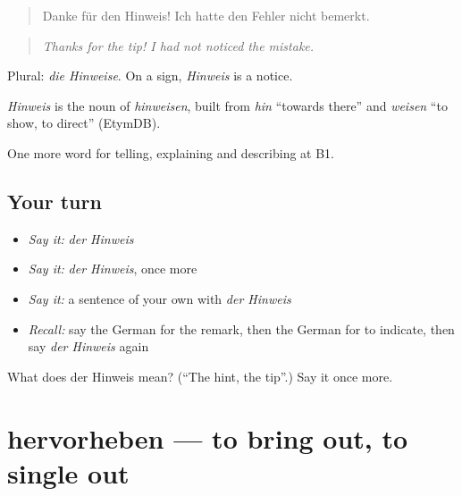 \begin{quote}
Danke für den Hinweis! Ich hatte den Fehler nicht bemerkt.
\end{quote}

\begin{quote}
\emph{Thanks for the tip! I had not noticed the mistake.}
\end{quote}

Plural: \emph{die Hinweise}. On a sign, \emph{Hinweis} is a notice.

\begin{cousinweb}
\emph{Hinweis} is the noun of \emph{hinweisen}, built from \emph{hin} \textquotedblleft{}towards there\textquotedblright{} and \emph{weisen} \textquotedblleft{}to show, to direct\textquotedblright{} (EtymDB).
\end{cousinweb}

\begin{grammarlens}[title={What you've built}]
One more word for telling, explaining and describing at B1.
\end{grammarlens}

\subsection*{Your turn}
\begin{itemize}
\raggedright
  \item \emph{Say it:} \emph{der Hinweis}
  \item \emph{Say it:} \emph{der Hinweis}, once more
  \item \emph{Say it:} a sentence of your own with \emph{der Hinweis}
  \item \emph{Recall:} say the German for the remark, then the German for to indicate, then say \emph{der Hinweis} again
\end{itemize}

\begin{tcolorbox}[breakable,colback=teal!4,colframe=teal!35!black,title={Before you move on}]
What does der Hinweis mean? (\textquotedblleft{}The hint, the tip\textquotedblright{}.) Say it once more.
\end{tcolorbox}
\section[hervorheben]{hervorheben — to bring out, to single out}

\label{lesson:GE-C339-hervorheben}



